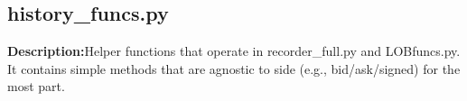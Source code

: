 \subsection{history\_funcs.py}\hfill \break
\noindent \textbf{Description:}Helper functions that operate in recorder\_full.py and LOBfuncs.py. It contains simple methods that are agnostic to side (e.g., bid/ask/signed) for the most part.  
















\newpage